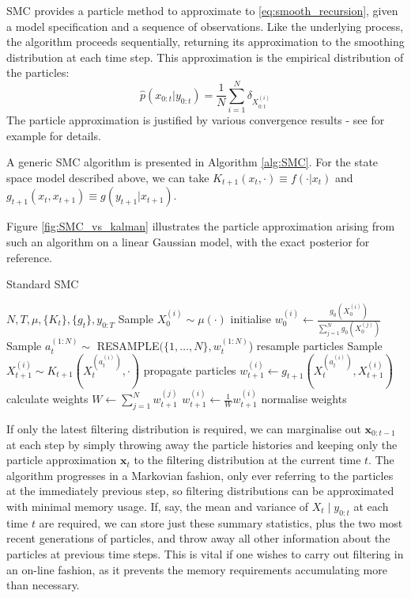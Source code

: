 \documentclass[fleqn]{article}
\newcommand{\wt}[2][t]{w_{#1}^{(#2)}}
\begin{document}
SMC provides a particle method to approximate to \eqref{eq:smooth_recursion}, given a model specification and a sequence of observations. Like the underlying process, the algorithm proceeds sequentially, returning its approximation to the smoothing distribution at each time step.
This approximation is the empirical distribution of the particles:
\begin{equation}
\hat{p}(x_{0:t}|y_{0:t}) = \frac{1}{N} \sum_{i=1}^N \delta_{X_{0:t}^{(i)}}
\end{equation}
The particle approximation is justified by various convergence results - see for example \citet{delmoral2013} for details.

A generic SMC algorithm is presented in Algorithm \ref{alg:SMC}. For the state space model described above, we can take $K_{t+1}(x_t, \cdot) \equiv f(\cdot | x_t)$ and $g_{t+1}(x_t, x_{t+1}) \equiv g(y_{t+1} | x_{t+1})$.

Figure \ref{fig:SMC_vs_kalman} illustrates the particle approximation arising from such an algorithm on a linear Gaussian model, with the exact posterior for reference.

\begin{algorithm}
\caption{Standard SMC}\label{alg:SMC}
\begin{algorithmic}[1]
\Require $N, T, \mu, \{K_t\}, \{g_t\}, y_{0:T}$
	\State Sample $X_0^{(i)} \sim \mu(\cdot)$  \Comment initialise
	\State $w_0^{(i)} \gets \frac{g_0(X_0^{(i)})}{\sum_{j=1}^N g_0(X_0^{(j)})}$
\EndFor
{}
	\State Sample $a_t^{(1:N)} \sim $ {\footnotesize RESAMPLE}$(\{1,\dots ,N\}, \wt{1:N}$) \Comment resample particles
		\State Sample $X_{t+1}^{(i)} \sim K_{t+1}(X_t^{(a_t^{(i)})}, \cdot)$ \Comment propagate particles
		\State $w_{t+1}^{(i)} \gets g_{t+1}(X_t^{(a_t^{(i)})} , X_{t+1}^{(i)})$ \Comment calculate weights
	\EndFor
	\State $W \gets \sum_{j=1}^N w_{t+1}^{(j)}$
		\State $w_{t+1}^{(i)} \gets \frac{1}{W}w_{t+1}^{(i)}$ \Comment normalise weights
	\EndFor
\EndFor
\end{algorithmic}
\end{algorithm}

If only the latest filtering distribution is required, we can marginalise out $\mathbf{x}_{0:t-1}$ at each step by simply throwing away the particle histories and keeping only the particle approximation $\mathbf{x}_{t}$ to the filtering distribution at the current time $t$. 
The algorithm progresses in a Markovian fashion, only ever referring to the particles at the immediately previous step, so filtering distributions can be approximated with minimal memory usage. 
If, say, the mean and variance of $X_{t} \mid y_{0:t}$ at each time $t$ are required, we can store just these summary statistics, plus the two most recent generations of particles, and throw away all other information about the particles at previous time steps. This is vital if one wishes to carry out filtering in an on-line fashion, as it prevents the memory requirements accumulating more than necessary.
\end{document}
